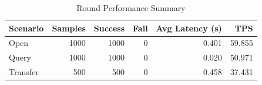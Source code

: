 \begin{table}
\caption{Round Performance Summary}
\label{tab:round_perf}
\begin{tabular}{lrrrrr}
\toprule
Scenario & Samples & Success & Fail & Avg Latency (s) & TPS \\
\midrule
Open & 1000 & 1000 & 0 & 0.401 & 59.855 \\
Query & 1000 & 1000 & 0 & 0.020 & 50.971 \\
Transfer & 500 & 500 & 0 & 0.458 & 37.431 \\
\bottomrule
\end{tabular}
\end{table}
